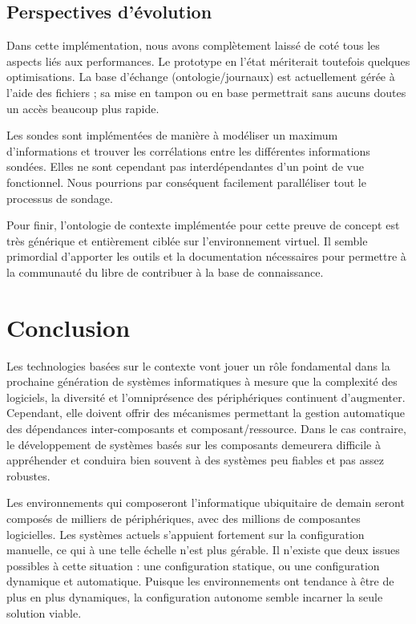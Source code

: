 \subsection{Perspectives d'évolution}

Dans cette implémentation, nous avons complètement laissé de coté tous les
aspects liés aux performances. Le prototype en l'état mériterait toutefois
quelques optimisations. La base d'échange (ontologie/journaux) est actuellement
gérée à l'aide des fichiers ; sa mise en tampon ou en base permettrait sans
aucuns doutes un accès beaucoup plus rapide.

Les sondes sont implémentées de manière à modéliser un maximum d'informations
et trouver les corrélations entre les différentes informations sondées. Elles
ne sont cependant pas interdépendantes d'un point de vue fonctionnel. Nous
pourrions par conséquent facilement paralléliser tout le processus de sondage.

Pour finir, l'ontologie de contexte implémentée pour cette preuve de concept
est très générique et entièrement ciblée sur l'environnement virtuel. Il semble
primordial d'apporter les outils et la documentation nécessaires pour permettre
à la communauté du libre de contribuer à la base de connaissance.

\section{Conclusion}

Les technologies basées sur le contexte vont jouer un rôle fondamental dans la
prochaine génération de systèmes informatiques à mesure que la complexité des
logiciels, la diversité et l'omniprésence des périphériques continuent
d'augmenter. Cependant, elle doivent offrir des mécanismes permettant la
gestion automatique des dépendances inter-composants et composant/ressource.
Dans le cas contraire, le développement de systèmes basés sur les composants
demeurera difficile à appréhender et conduira bien souvent à des systèmes peu
fiables et pas assez robustes.

Les environnements qui composeront l'informatique ubiquitaire de demain seront
composés de milliers de périphériques, avec des millions de composantes
logicielles. Les systèmes actuels s'appuient fortement sur la configuration
manuelle, ce qui à une telle échelle n'est plus gérable. Il n'existe que deux
issues possibles à cette situation : une configuration statique, ou une
configuration dynamique et automatique. Puisque les environnements ont
tendance à être de plus en plus dynamiques, la configuration autonome semble
incarner la seule solution viable.


